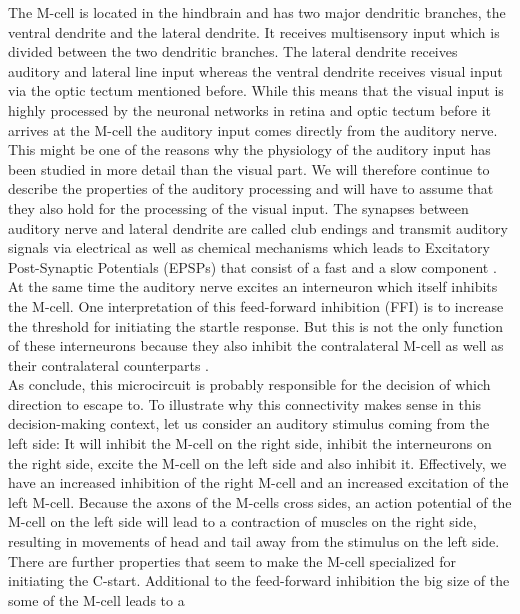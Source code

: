 	The M-cell is located in the hindbrain and has two major dendritic branches, the ventral 
	dendrite and the lateral dendrite.
	It receives multisensory input which is divided between the two dendritic branches.
	The lateral dendrite receives auditory and lateral line input whereas the ventral dendrite 
	receives visual input via the optic tectum mentioned before.
	While this means that the visual input is highly processed by the neuronal networks in retina and optic 
	tectum before it arrives at the M-cell the auditory input comes directly from the auditory 
	nerve.
	This might be one of the reasons why the physiology of the auditory input has been studied in 
	more detail than the visual part.
	We will therefore continue to describe the properties of the auditory processing and will have 
	to assume that they also hold for the processing of the visual input.
	The synapses between auditory nerve and lateral dendrite are called club endings and transmit 
	auditory signals via electrical as well as chemical mechanisms which leads to Excitatory 
	Post-Synaptic Potentials (EPSPs) that consist of a fast and a slow component \citep{Korn2005}.
	At the same time the auditory nerve excites an interneuron which itself inhibits the M-cell.
	One interpretation of this feed-forward inhibition (FFI) is to increase the threshold for 
	initiating the startle response.
	But this is not the only function of these interneurons because they also inhibit the 
	contralateral M-cell as well as their contralateral counterparts \citep{Koyama2016}.\\
	As \cite{Koyama2016} conclude, this microcircuit is probably responsible for the decision of which direction to escape to.
	To illustrate why this connectivity makes sense in this decision-making context, let us 
	consider an auditory stimulus coming from the left side:
	It will inhibit the M-cell on the right side, inhibit the interneurons on the right side, excite the M-cell on the left side and also inhibit it.
	Effectively, we have an increased inhibition of the right M-cell and an increased excitation of the left M-cell.
	Because the axons of the M-cells cross sides, an action potential of the M-cell on the left 
	side will lead to a contraction of muscles on the right side, resulting in movements of head 
	and tail away from the stimulus on the left side.\\
	There are further properties that seem to make the M-cell specialized for initiating the 
	C-start.
	Additional to the feed-forward inhibition the big size of the some of the M-cell leads to a 
